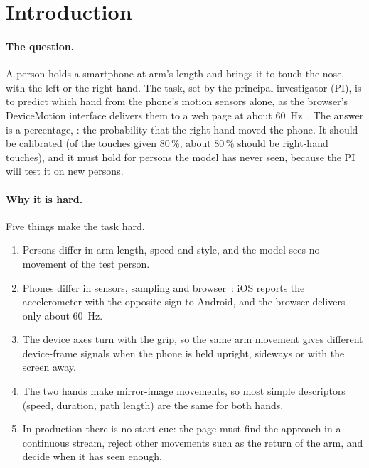\section{Introduction}\label{sec:intro}

\paragraph{The question.} A person holds a smartphone at arm's length and brings it to touch the nose, with the left
or the right hand. The task, set by the principal investigator (PI), is to predict which hand from the phone's
motion sensors alone, as the browser's DeviceMotion interface delivers them to a web page at about
60~Hz~\cite{w3c2025deviceorientation}. The answer is a percentage, \pright{}: the probability that the right hand
moved the phone. It should be calibrated (of the touches given 80\,\%, about 80\,\% should be right-hand touches),
and it must hold for persons the model has never seen, because the PI will test it on new persons.

\paragraph{Why it is hard.} Five things make the task hard.
\begin{enumerate}[nosep,leftmargin=1.5em]
  \item Persons differ in arm length, speed and style, and the model sees no movement of the test person.
  \item Phones differ in sensors, sampling and browser~\cite{stisen2015heterogeneity}: iOS reports the
    accelerometer with the opposite sign to Android, and the browser delivers only about 60~Hz.
  \item The device axes turn with the grip, so the same arm movement gives different device-frame signals when the
    phone is held upright, sideways or with the screen away.
  \item The two hands make mirror-image movements, so most simple descriptors (speed, duration, path length) are
    the same for both hands.
  \item In production there is no start cue: the page must find the approach in a continuous stream, reject other
    movements such as the return of the arm, and decide when it has seen enough.
\end{enumerate}

